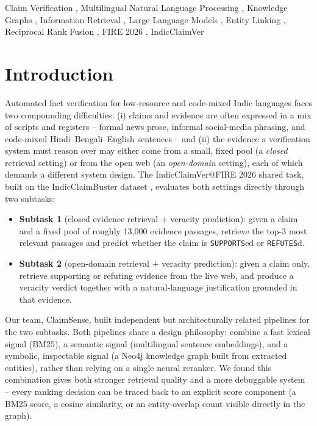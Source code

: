 \documentclass[
]{ceurart}
\begin{document}
\begin{keywords}
  Claim Verification \sep
  Multilingual Natural Language Processing \sep
  Knowledge Graphs \sep
  Information Retrieval \sep
  Large Language Models \sep
  Entity Linking \sep
  Reciprocal Rank Fusion \sep
  FIRE 2026 \sep
  IndicClaimVer
\end{keywords}

\maketitle

\section{Introduction}

Automated fact verification for low-resource and code-mixed Indic
languages faces two compounding difficulties: (i) claims and evidence are
often expressed in a mix of scripts and registers -- formal news prose,
informal social-media phrasing, and code-mixed Hindi--Bengali--English
sentences -- and (ii) the evidence a verification system must reason over
may either come from a small, fixed pool (a \emph{closed} retrieval
setting) or from the open web (an \emph{open-domain} setting), each of
which demands a different system design. The IndicClaimVer@FIRE 2026
shared task, built on the IndicClaimBuster dataset
\cite{pal-etal-2025-indicclaimbuster}, evaluates both settings directly
through two subtasks:

\begin{itemize}
  \item \textbf{Subtask 1} (closed evidence retrieval + veracity
    prediction): given a claim and a fixed pool of roughly 13{,}000
    evidence passages, retrieve the top-3 most relevant passages and
    predict whether the claim is \texttt{SUPPORTS}ed or
    \texttt{REFUTES}d.
  \item \textbf{Subtask 2} (open-domain retrieval + veracity
    prediction): given a claim only, retrieve supporting or refuting
    evidence from the live web, and produce a veracity verdict together
    with a natural-language justification grounded in that evidence.
\end{itemize}

Our team, ClaimSense, built independent but architecturally related
pipelines for the two subtasks. Both pipelines share a design
philosophy: combine a fast lexical signal (BM25), a semantic signal
(multilingual sentence embeddings), and a symbolic, inspectable signal
(a Neo4j knowledge graph built from extracted entities), rather than
relying on a single neural reranker. We found this combination gives
both stronger retrieval quality and a more debuggable system -- every
ranking decision can be traced back to an explicit score component (a
BM25 score, a cosine similarity, or an entity-overlap count visible
directly in the graph).
\end{document}
